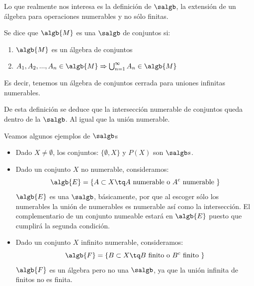 \documentclass{apuntes}
\begin{document}
Lo que realmente nos interesa es la definición de $\salgb$, la extensión de un álgebra para operaciones numerables y no sólo finitas.

\begin{defn}[.$\salgb$] %
Se dice que $\algb{M}$ es una $\salgb$ de conjuntos si:
\begin{enumerate}
\item $\algb{M}$ es un álgebra de conjuntos
\item $A_1,A_2,...,A_n \in \algb{M} \Rightarrow \bigcup_{n=1}^{\infty} A_n\in \algb{M}$
\end{enumerate}
Es decir, tenemos un álgebra de conjuntos cerrada para uniones infinitas numerables.

\end{defn}

De esta definición se deduce que la intersección numerable de conjuntos queda dentro de la $\salgb$. Al igual que la unión numerable.



\begin{example}
Veamos algunos ejemplos de $\salgb$s
\begin{itemize}
\item Dado $X\neq \emptyset$, los conjuntos: $\lbrace \emptyset, X \rbrace$  y $P(X)$ son $\salgb s$.

\item Dado un conjunto $X$ no numerable, consideramos:
\[\algb{E}=\lbrace A \subset X \tq A \text{ numerable o } A^c \text{ numerable }\rbrace\]
$\algb{E}$ es una $\salgb$, básicamente, por que al escoger sólo los numerables la unión de numerables es numerable así como la intersección. El complementario de un conjunto numeable estará en $\algb{E}$ puesto que cumplirá la segunda condición.


\item Dado un conjunto $X$ infinito numerable, consideramos:
\[\algb{F}=\lbrace B \subset X \tq B \text{ finito o } B^c \text{ finito }\rbrace\]
$\algb{F}$ es un álgebra pero no una $\salgb$, ya que la unión infinita de finitos no es finita.
\end{itemize}
\end{example}
\end{document}
